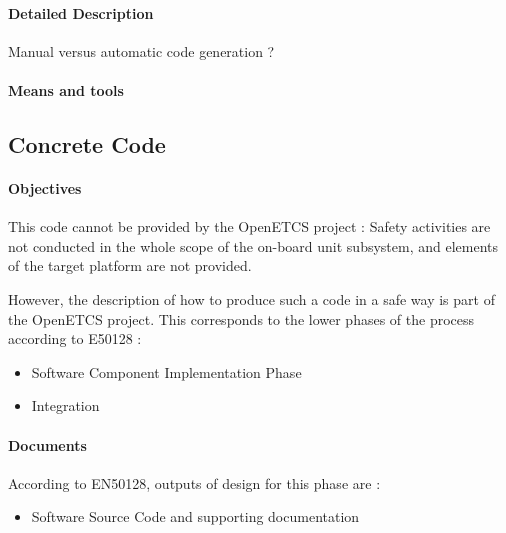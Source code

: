 

\paragraph{Detailed Description}
\label{sec:demo-deta-descr}


\begin{issue}
Manual versus automatic code generation ?
\end{issue}

\paragraph{Means and tools}
\label{sec:demo-means}




\subsection{Concrete Code}
\label{sec:code-phase}


\paragraph{Objectives}
\label{sec:code-objective}

This code cannot be provided by the OpenETCS project : Safety  activities are not conducted in the whole scope of the on-board unit subsystem, and elements of the target platform are not provided.

However, the description of how to  produce such a code in a safe way is part of the OpenETCS project. This corresponds to the lower phases of the process according to  E50128 :
\begin{itemize}
\item Software Component Implementation Phase
\item Integration
\end{itemize}


\paragraph{Documents}
\label{sec:code-documents}

According to EN50128, outputs of design for this phase are :
\begin{itemize}
\item  Software Source Code and supporting documentation
\end{itemize}


